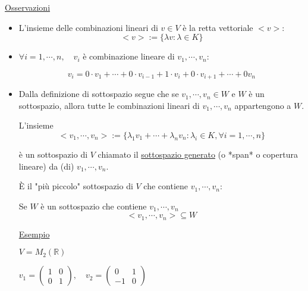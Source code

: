 \documentclass{article}
\newcommand{\ul}[1]{\underline{#1}}
\newcommand{\R}{\mathbb{R}}
\begin{document}
	\ul{Osservazioni}
	\begin{itemize}
		\item L'insieme delle combinazioni lineari di $v\in V$ è la retta vettoriale $<v>$:
		      $$<v>:=\{\lambda v:\lambda\in K\}$$
		\item $\forall i=1,\cdots,n,\quad v_i$ è combinazione lineare di $v_1,\cdots,v_n$:

		      $$v_i=0\cdot v_1+\cdots+0\cdot v_{i-1}+1\cdot v_i+0\cdot v_{i+1}+\cdots+0v_n$$
		\item Dalla definizione di sottospazio segue che se $v_1,\cdots,v_n\in W$ e $W$ è un sottospazio, allora tutte le combinazioni lineari di $v_1,\cdots,v_n$ appartengono a $W$.

		      L'insieme
		      $$<v_1,\cdots,v_n>:=\{\lambda_1v_1+\cdots+\lambda_nv_n:\lambda_i\in K,\forall i=1,\cdots,n\}$$

		      è un sottospazio di $V$ chiamato il \ul{sottospazio generato} (o *span* o copertura lineare) da (di) $v_1,\cdots,v_n$.

		      È il "più piccolo" sottospazio di $V$ che contiene $v_1,\cdots,v_n$:

		      Se $W$ è un sottospazio che contiene $v_1,\cdots,v_n$
		      $$<v_1,\cdots,v_n>\subseteq W$$

		      \ul{Esempio}

		      $V=M_2(\R)$

		      $v_1=\begin{pmatrix}1&0\\0&1\end{pmatrix},\quad v_2=\begin{pmatrix}0&1\\-1&0\end{pmatrix}$


\end{itemize}
\end{document}
